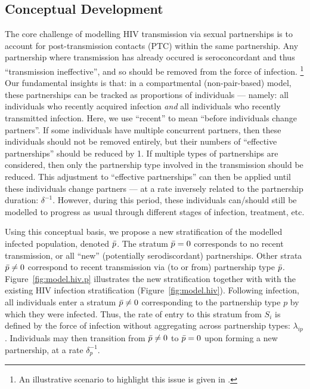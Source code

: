 \subsection{Conceptual Development}\label{foi.prop.concept}
The core challenge of modelling HIV transmission via sexual partnerships is
to account for post-transmission contacts (PTC) within the same partnership.
Any partnership where transmission has already occured
is seroconcordant and thus ``transmission ineffective'',
and so should be removed from the force of infection.%
\footnote{An illustrative scenario to highlight this issue is given in .}
Our fundamental insights is that:
in a compartmental (non-pair-based) model,
these partnerships can be tracked as proportions of individuals --- namely:
all individuals who recently acquired infection \emph{and}
all individuals who recently transmitted infection.
Here, we use ``recent'' to mean ``before individuals change partners''.
If some individuals have multiple concurrent partners,
then these individuals should not be removed entirely,
but their numbers of ``effective partnerships'' should be reduced by 1.
If multiple types of partnerships are considered,
then only the partnership type involved in the transmission should be reduced.
This adjustment to ``effective partnerships'' can then be applied
until these individuals change partners
--- at a rate inversely related to the partnership duration: $\delta^{-1}$.
However, during this period, these individuals can/should still be modelled
to progress as usual through different stages of infection, treatment, etc.
\par
Using this conceptual basis,
we propose a new stratification of the modelled infected population, denoted $\bar{p}$.
The stratum $\bar{p} = 0$ corresponds to no recent transmission,
or all ``new'' (potentially serodiscordant) partnerships.
Other strata $\bar{p} \ne 0$ correspond to recent transmission via (to or from) partnership type $\bar{p}$.
Figure~\ref{fig:model.hiv.p} illustrates the new stratification
together with with the existing HIV infection stratification (Figure~\ref{fig:model.hiv}).
Following infection, all individuals enter a stratum $\bar{p} \ne 0$
corresponding to the partnership type $p$ by which they were infected.
Thus, the rate of entry to this stratum from $S_i$ is defined by
the force of infection without aggregating across partnership types: $\lambda_{ip}$.
Individuals may then transition from $\bar{p} \ne 0$ to $\bar{p} = 0$
upon forming a new partnership, at a rate $\delta_p^{-1}$.
